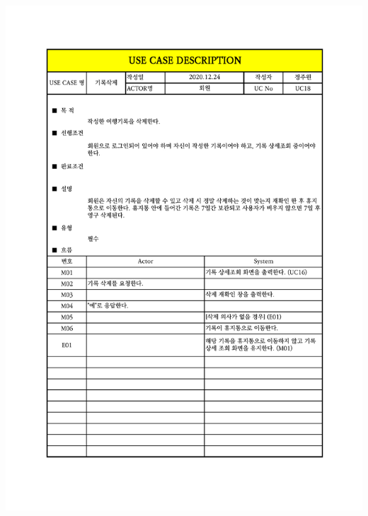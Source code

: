 {{{{{{{{{{{{{{{{{{{{\includegraphics[width=1.1\textwidth]{./Figure/Design/Display/usecase/018.pdf} \\
}}}}}}}}}}}}}}}}}}}}
